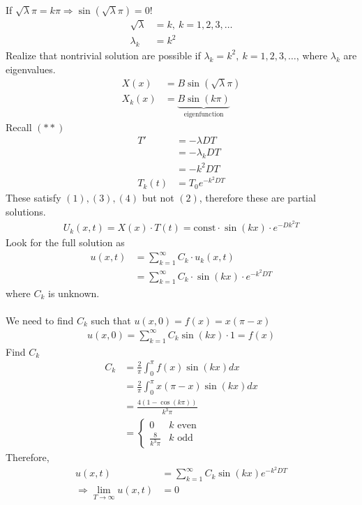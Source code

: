 \documentclass[12pt, letterpaper]{article}
\begin{document}
If $\sqrt \lambda \pi = k\pi \Rightarrow \sin(\sqrt \lambda \pi) = 0$!
\begin{align*}
    \sqrt \lambda &= k,\ k=1,2,3,\dots \\
    \lambda_k &= k^2
\end{align*}
Realize that nontrivial solution are possible if $\lambda_k = k^2,\ k=1,2,3,\dots$, where
$\lambda_k$ are eigenvalues.
\begin{align*}
    X(x) &= B\sin(\sqrt \lambda \pi) \\
    X_k(x) &= \underbrace{B\sin(k\pi)}_{\text{eigenfunction}}
\end{align*}
Recall $(\ast \ast)$
\begin{align*}
    T' &= -\lambda DT \\
    &= -\lambda_k DT \\
    &= -k^2 DT \\
    T_k (t) &=T_0 e^{-k^2DT}
\end{align*}
These satisfy $(1),(3),(4)$ but not $(2)$, therefore these are partial solutions.
\begin{align*}
    U_k(x,t) = X(x) \cdot T(t) = \text{const} \cdot \sin(kx) \cdot e^{-Dk^2T}
\end{align*}
Look for the full solution as 
\begin{align*}
    u(x,t) &= \sum_{k=1}^{\infty} C_k\cdot u_k(x,t) \\
    &= \sum_{k=1}^{\infty} C_k \cdot \sin(kx) \cdot e^{-k^2 DT}
\end{align*}
where $C_k$ is unknown. \\ \\
We need to find $C_k$ such that $u(x,0) = f(x) = x(\pi - x)$ 
\begin{align*}
    u(x,0) = \sum_{k=1 }^{\infty} C_k \sin(kx)\cdot 1 = f(x)
\end{align*}
Find $C_k$
\begin{align*}
    C_k &= \frac 2\pi \int_{0}^{\pi}f(x)\sin(kx)dx \\
    &= \frac 2\pi \int_{0}^{\pi}x(\pi-x)\sin(kx)dx \\
    &= \frac{4(1-\cos(k\pi))}{k^3\pi} \\
    &= \begin{cases}
        0 & k \text{ even} \\
        \frac{8}{k^3\pi} & k \text{ odd}
    \end{cases}
\end{align*}
Therefore,
\begin{align*}
    u(x,t) &= \sum_{k=1}^{\infty} C_k \sin(kx) e^{-k^2DT} \\
    \Rightarrow \lim_{T\rightarrow \infty} u(x,t) &= 0
\end{align*}
\end{document}
